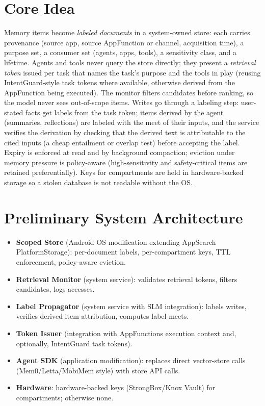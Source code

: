 \documentclass[11pt]{article}
\begin{document}
\section{Core Idea}
Memory items become \emph{labeled documents} in a system-owned store: each carries provenance (source app, source AppFunction or channel, acquisition time), a purpose set, a consumer set (agents, apps, tools), a sensitivity class, and a lifetime. Agents and tools never query the store directly; they present a \emph{retrieval token} issued per task that names the task's purpose and the tools in play (reusing IntentGuard-style task tokens where available, otherwise derived from the AppFunction being executed). The monitor filters candidates before ranking, so the model never sees out-of-scope items. Writes go through a labeling step: user-stated facts get labels from the task token; items derived by the agent (summaries, reflections) are labeled with the meet of their inputs, and the service verifies the derivation by checking that the derived text is attributable to the cited inputs (a cheap entailment or overlap test) before accepting the label. Expiry is enforced at read and by background compaction; eviction under memory pressure is policy-aware (high-sensitivity and safety-critical items are retained preferentially). Keys for compartments are held in hardware-backed storage so a stolen database is not readable without the OS.

\section{Preliminary System Architecture}
\begin{itemize}
  \item \textbf{Scoped Store} (Android OS modification extending AppSearch PlatformStorage): per-document labels, per-compartment keys, TTL enforcement, policy-aware eviction.
  \item \textbf{Retrieval Monitor} (system service): validates retrieval tokens, filters candidates, logs accesses.
  \item \textbf{Label Propagator} (system service with SLM integration): labels writes, verifies derived-item attribution, computes label meets.
  \item \textbf{Token Issuer} (integration with AppFunctions execution context and, optionally, IntentGuard task tokens).
  \item \textbf{Agent SDK} (application modification): replaces direct vector-store calls (Mem0/Letta/MobiMem style) with store API calls.
  \item \textbf{Hardware}: hardware-backed keys (StrongBox/Knox Vault) for compartments; otherwise none.
\end{itemize}
\end{document}
